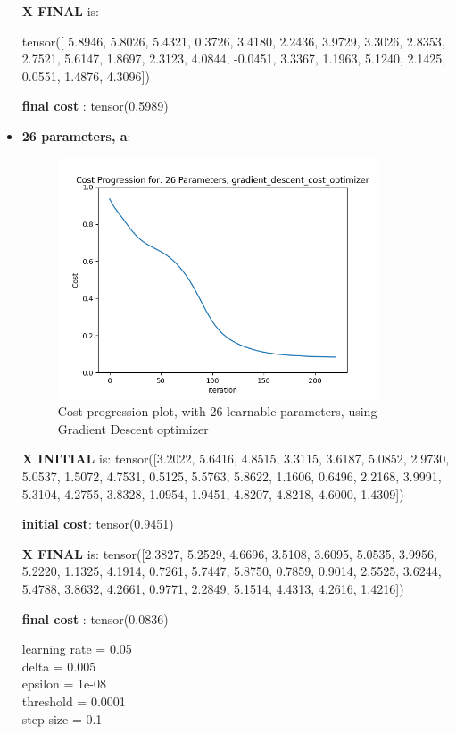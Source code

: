 \documentclass[inscr,ack,preface]{diphdthesis}
\begin{document}
\begin{itemize}
\textbf{X FINAL} is:

 tensor([ 5.8946,  5.8026,  5.4321,  0.3726,  3.4180,  2.2436,  3.9729,  3.3026,
         2.8353,  2.7521,  5.6147,  1.8697,  2.3123,  4.0844, -0.0451,  3.3367,
         1.1963,  5.1240,  2.1425,  0.0551,  1.4876,  4.3096])

\textbf{final cost} : tensor(0.5989)

\item \textbf{26 parameters, a}:

\begin{figure}[ht]
\begin{center}
    \includegraphics[width=0.9\textwidth]{26.png}
    \caption{Cost progression plot, with 26 learnable parameters, using Gradient Descent optimizer} 
    \label{fig:enter-label}
    \end{center}
\end{figure}

\textbf{X INITIAL} is:
 tensor([3.2022, 5.6416, 4.8515, 3.3115, 3.6187, 5.0852, 2.9730, 5.0537, 1.5072,
        4.7531, 0.5125, 5.5763, 5.8622, 1.1606, 0.6496, 2.2168, 3.9991, 5.3104,
        4.2755, 3.8328, 1.0954, 1.9451, 4.8207, 4.8218, 4.6000, 1.4309])

\textbf{initial cost}: tensor(0.9451)

\textbf{X FINAL} is: 
 tensor([2.3827, 5.2529, 4.6696, 3.5108, 3.6095, 5.0535, 3.9956, 5.2220, 1.1325,
        4.1914, 0.7261, 5.7447, 5.8750, 0.7859, 0.9014, 2.5525, 3.6244, 5.4788,
        3.8632, 4.2661, 0.9771, 2.2849, 5.1514, 4.4313, 4.2616, 1.4216])

\textbf{final cost} : tensor(0.0836)

learning rate =  0.05 \\
delta =  0.005 \\
epsilon =  1e-08 \\
threshold =  0.0001\\ 
step size =  0.1 \\


\end{itemize}
\end{document}
